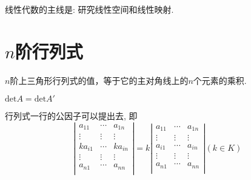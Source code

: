 

\begin{Note}
线性代数的主线是: 研究线性空间和线性映射.
\end{Note}

\section{$n$阶行列式}

\begin{Proposition}
$n$阶上三角形行列式的值，等于它的主对角线上的$n$个元素的乘积.
\end{Proposition}

\begin{Property}
$\mathrm{det}A = \mathrm{det}A'$
\end{Property}

\begin{Property}
行列式一行的公因子可以提出去, 即
$$
\left| \begin{matrix}
a_{11} & \cdots & a_{1n} \\
\vdots & \vdots & \vdots \\
ka_{i1} &\cdots & k a_{in} \\
\vdots & \vdots & \vdots \\
a_{n1} & \cdots & a_{nn} \\
\end{matrix} \right| = k \left|
\begin{matrix}
a_{11} & \cdots & a_{1n} \\
\vdots & \vdots & \vdots \\
a_{i1} & \cdots & a_{in} \\
\vdots & \vdots & \vdots \\
a_{n1} & \cdots & a_{nn} \\
\end{matrix} \right| (k \in K)$$
\end{Property}

